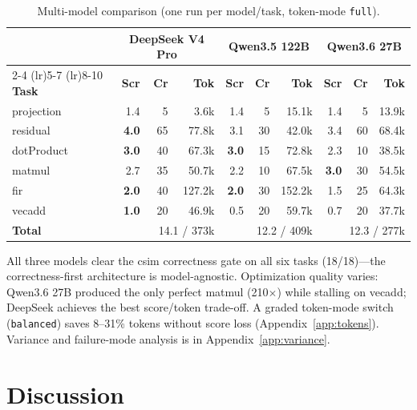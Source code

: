 \documentclass[10pt,conference,letterpaper]{IEEEtran}
\begin{document}
\begin{table}[h]
\centering
\caption{Multi-model comparison (one run per model/task, token-mode \texttt{full}).}
\label{tab:multimodel}
\scriptsize
\begin{tabular}{l rrr rrr rrr}
\toprule
& \multicolumn{3}{c}{\textbf{DeepSeek V4 Pro}} & \multicolumn{3}{c}{\textbf{Qwen3.5 122B}} & \multicolumn{3}{c}{\textbf{Qwen3.6 27B}} \\
\cmidrule(lr){2-4} \cmidrule(lr){5-7} \cmidrule(lr){8-10}
\textbf{Task} & \textbf{Scr} & \textbf{Cr} & \textbf{Tok} & \textbf{Scr} & \textbf{Cr} & \textbf{Tok} & \textbf{Scr} & \textbf{Cr} & \textbf{Tok} \\
\midrule
projection & 1.4 & 5 & 3.6k & 1.4 & 5 & 15.1k & 1.4 & 5 & 13.9k \\
residual & \textbf{4.0} & 65 & 77.8k & 3.1 & 30 & 42.0k & 3.4 & 60 & 68.4k \\
dotProduct & \textbf{3.0} & 40 & 67.3k & \textbf{3.0} & 15 & 72.8k & 2.3 & 10 & 38.5k \\
matmul & 2.7 & 35 & 50.7k & 2.2 & 10 & 67.5k & \textbf{3.0} & 30 & 54.5k \\
fir & \textbf{2.0} & 40 & 127.2k & \textbf{2.0} & 30 & 152.2k & 1.5 & 25 & 64.3k \\
vecadd & \textbf{1.0} & 20 & 46.9k & 0.5 & 20 & 59.7k & 0.7 & 20 & 37.7k \\
\midrule
\textbf{Total} & \multicolumn{3}{r}{14.1 / 373k} & \multicolumn{3}{r}{12.2 / 409k} & \multicolumn{3}{r}{12.3 / 277k} \\
\bottomrule
\end{tabular}
\end{table}

All three models clear the csim correctness gate on all six tasks (18/18)---the correctness-first architecture is model-agnostic. Optimization quality varies: Qwen3.6 27B produced the only perfect matmul (210$\times$) while stalling on vecadd; DeepSeek achieves the best score/token trade-off. A graded token-mode switch (\texttt{balanced}) saves 8--31\% tokens without score loss (Appendix~\ref{app:tokens}). Variance and failure-mode analysis is in Appendix~\ref{app:variance}.

\section{Discussion}
\end{document}
